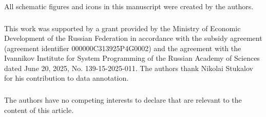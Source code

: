 \documentclass[runningheads,a4paper]{llncs}
\begin{document}
All schematic figures and icons
in this manuscript were created by the authors.

\begin{credits}
\subsubsection{\ackname}
This work was supported by a grant provided by the Ministry of Economic
Development of the Russian Federation in accordance with the subsidy agreement
(agreement identifier 000000C313925P4G0002) and the agreement with the Ivannikov
Institute for System Programming of the Russian Academy of Sciences dated
June 20, 2025, No. 139-15-2025-011. The authors thank Nikolai Stukalov for his
contribution to data annotation.

\subsubsection{\discintname}
The authors have no competing interests to declare that are relevant to the
content of this article.
\end{credits}


\end{document}
